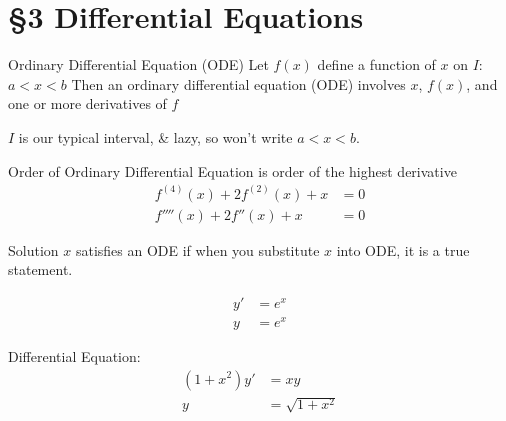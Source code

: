 \section{\S 3 Differential Equations}
\begin{imp:defn}{Ordinary Differential Equation (ODE)}{} Let $f(x)$ define a function of $x$ on $I$:$a<x<b$ Then an ordinary differential equation (ODE) involves $x$, $f(x)$, and one or more derivatives of $f$
\end{imp:defn}
\begin{note} $I$ is our typical interval, & lazy, so won't write $a<x<b$.
\end{note}
\begin{remark}Order of Ordinary Differential Equation is order of the highest derivative
\begin{align*}
    f^{(4)}(x)+2f^{(2)}(x)+x & =0\\
    f''''(x)+2f''(x)+x & = 0
\end{align*}
\end{remark}
\begin{remark}Solution $x$ satisfies an ODE if when you substitute $x$ into ODE, it is a true statement.
\end{remark}
\begin{ex}
\begin{align*}
    y' & =e^{x}\\
    y & =e^{x}
\end{align*}
\end{ex}
\begin{ex}Differential Equation:
\begin{align*}
    (1+x^{2})y' & =xy\\
    y & = \sqrt{1+x^{2}}
\end{align*}
\end{ex}
